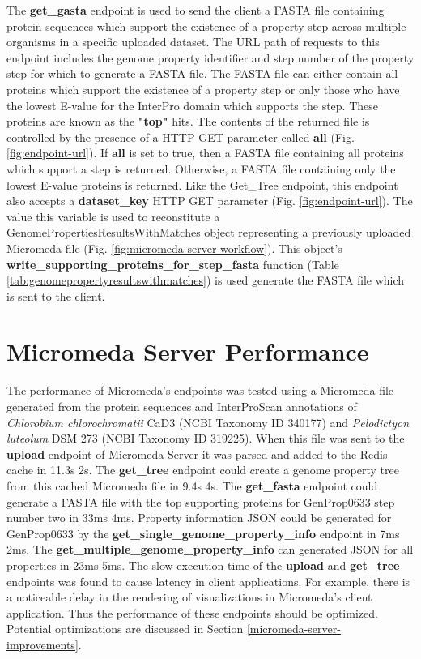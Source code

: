 The \textbf{get\_gasta} endpoint is used to send the client a FASTA file containing protein sequences which support the existence of a property step across multiple organisms in a specific uploaded dataset. The URL path of requests to this endpoint includes the genome property identifier and step number of the property step for which to generate a FASTA file. The FASTA file can either contain all proteins which support the existence of a property step or only those who have the lowest E-value for the InterPro domain which supports the step. These proteins are known as the \textbf{"top"} hits. The contents of the returned file is controlled by the presence of a HTTP GET parameter called \textbf{all} (Fig. \ref{fig:endpoint-url}). If \textbf{all} is set to true, then a FASTA file containing all proteins which support a step is returned. Otherwise, a FASTA file containing only the lowest E-value proteins is returned. Like the Get\_Tree endpoint, this endpoint also accepts a \textbf{dataset\_key} HTTP GET parameter (Fig. \ref{fig:endpoint-url}). The value this variable is used to reconstitute a GenomePropertiesResultsWithMatches object representing a previously uploaded Micromeda file (Fig. \ref{fig:micromeda-server-workflow}). This object's \textbf{write\_supporting\_proteins\_for\_step\_fasta} function (Table \ref{tab:genomepropertyresultswithmatches}) is used generate the FASTA file which is sent to the client.

\section{Micromeda Server Performance} \label{micromeda-server-performance}

The performance of Micromeda's endpoints was tested using a Micromeda file generated from the protein sequences and InterProScan annotations of \textit{Chlorobium chlorochromatii} CaD3 (NCBI Taxonomy ID 340177) and \textit{Pelodictyon luteolum} DSM 273 (NCBI Taxonomy ID 319225). When this file was sent to the \textbf{upload} endpoint of Micromeda-Server it was parsed and added to the Redis cache in 11.3s \textpm 2s. The \textbf{get\_tree} endpoint could create a genome property tree from this cached Micromeda file in 9.4s \textpm 4s. The \textbf{get\_fasta} endpoint could generate a FASTA file with the top supporting proteins for GenProp0633 step number two in 33ms \textpm 4ms. Property information JSON could be generated for GenProp0633 by the \textbf{get\_single\_genome\_property\_info} endpoint in 7ms \textpm 2ms. The \textbf{get\_multiple\_genome\_property\_info} can generated JSON for all properties in 23ms \textpm 5ms. The slow execution time of the \textbf{upload} and \textbf{get\_tree} endpoints was found to cause latency in client applications. For example, there is a noticeable delay in the rendering of visualizations in Micromeda's client application. Thus the performance of these endpoints should be optimized. Potential optimizations are discussed in Section \ref{micromeda-server-improvements}.

